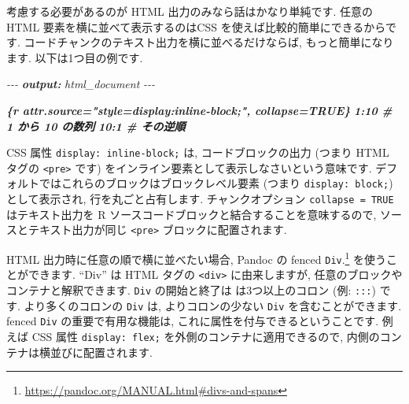 \documentclass[
  11pt,
  lualatex,
  ja=standard]{bxjsreport}
\newenvironment{Shaded}{\begin{snugshade}}{\end{snugshade}}
\newcommand{\AnnotationTok}[1]{\textcolor[rgb]{0.56,0.35,0.01}{\textbf{\textit{#1}}}}
\newcommand{\CommentTok}[1]{\textcolor[rgb]{0.56,0.35,0.01}{\textit{#1}}}
\newcommand{\InformationTok}[1]{\textcolor[rgb]{0.56,0.35,0.01}{\textbf{\textit{#1}}}}
\renewcommand{\href}[2]{#2\footnote{\url{#1}}}
\begin{document}
考慮する必要があるのが HTML 出力のみなら話はかなり単純です. 任意の HTML 要素を横に並べて表示するのはCSS を使えば比較的簡単にできるからです. コードチャンクのテキスト出力を横に並べるだけならば, もっと簡単になります. 以下は1つ目の例です.

\begin{Shaded}
\begin{Highlighting}[]
\CommentTok{{-}{-}{-}}
\AnnotationTok{output:}\CommentTok{ html\_document}
\CommentTok{{-}{-}{-}}

\InformationTok{\textasciigrave{}\textasciigrave{}\textasciigrave{}\{r attr.source="style=\textquotesingle{}display:inline{-}block;\textquotesingle{}", collapse=TRUE\}}
\InformationTok{1:10  \# 1 から 10 の数列}
\InformationTok{10:1  \# その逆順}
\InformationTok{\textasciigrave{}\textasciigrave{}\textasciigrave{}}
\end{Highlighting}
\end{Shaded}

CSS 属性 \texttt{display: inline-block;}  は, コードブロックの出力 (つまり HTML タグの \texttt{\textless{}pre\textgreater{}} です) をインライン要素として表示しなさいという意味です. デフォルトではこれらのブロックはブロックレベル要素 (つまり \texttt{display: block;}) として表示され, 行を丸ごと占有します. チャンクオプション \texttt{collapse = TRUE} はテキスト出力を R ソースコードブロックと結合することを意味するので, ソースとテキスト出力が同じ \texttt{\textless{}pre\textgreater{}} ブロックに配置されます.

HTML 出力時に任意の順で横に並べたい場合, Pandoc の \href{https://pandoc.org/MANUAL.html\#divs-and-spans}{fenced \texttt{Div}.} を使うことができます. ``Div'' は HTML タグの \texttt{\textless{}div\textgreater{}} に由来しますが, 任意のブロックやコンテナと解釈できます. \texttt{Div} の開始と終了は は3つ以上のコロン (例: \texttt{:::}) です. より多くのコロンの \texttt{Div} は, よりコロンの少ない \texttt{Div} を含むことができます. fenced \texttt{Div} の重要で有用な機能は, これに属性を付与できるということです. 例えば CSS 属性 \texttt{display: flex;} を外側のコンテナに適用できるので, 内側のコンテナは横並びに配置されます.
\end{document}
